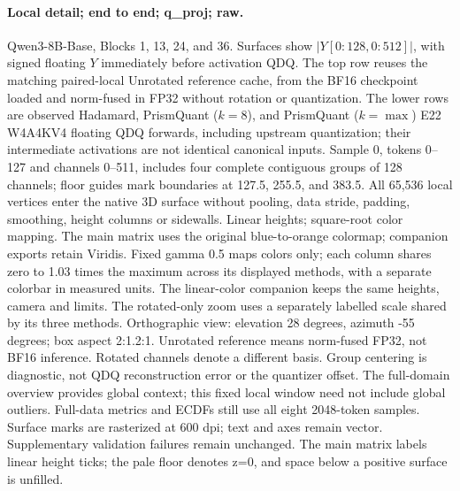 \paragraph{Local detail; end to end; q\_proj; raw.} Qwen3-8B-Base, Blocks 1, 13, 24, and 36. Surfaces show $|Y[0:128,0:512]|$, with signed floating $Y$ immediately before activation QDQ. The top row reuses the matching paired-local Unrotated reference cache, from the BF16 checkpoint loaded and norm-fused in FP32 without rotation or quantization. The lower rows are observed Hadamard, PrismQuant ($k=8$), and PrismQuant ($k=\max$) E22 W4A4KV4 floating QDQ forwards, including upstream quantization; their intermediate activations are not identical canonical inputs. Sample 0, tokens 0--127 and channels 0--511, includes four complete contiguous groups of 128 channels; floor guides mark boundaries at 127.5, 255.5, and 383.5. All 65,536 local vertices enter the native 3D surface without pooling, data stride, padding, smoothing, height columns or sidewalls. Linear heights; square-root color mapping. The main matrix uses the original blue-to-orange colormap; companion exports retain Viridis. Fixed gamma 0.5 maps colors only; each column shares zero to 1.03 times the maximum across its displayed methods, with a separate colorbar in measured units. The linear-color companion keeps the same heights, camera and limits. The rotated-only zoom uses a separately labelled scale shared by its three methods. Orthographic view: elevation 28 degrees, azimuth -55 degrees; box aspect 2:1.2:1. Unrotated reference means norm-fused FP32, not BF16 inference. Rotated channels denote a different basis. Group centering is diagnostic, not QDQ reconstruction error or the quantizer offset. The full-domain overview provides global context; this fixed local window need not include global outliers. Full-data metrics and ECDFs still use all eight 2048-token samples. Surface marks are rasterized at 600 dpi; text and axes remain vector. Supplementary validation failures remain unchanged. The main matrix labels linear height ticks; the pale floor denotes z=0, and space below a positive surface is unfilled.

